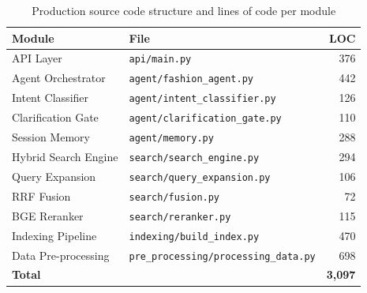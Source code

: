\begin{table}[H]
\centering
\begin{tabular}{llr}
\toprule
\textbf{Module} & \textbf{File} & \textbf{LOC}\\
\midrule
API Layer              & \texttt{api/main.py}                          & 376\\
Agent Orchestrator     & \texttt{agent/fashion\_agent.py}              & 442\\
Intent Classifier      & \texttt{agent/intent\_classifier.py}          & 126\\
Clarification Gate     & \texttt{agent/clarification\_gate.py}         & 110\\
Session Memory         & \texttt{agent/memory.py}                      & 288\\
Hybrid Search Engine   & \texttt{search/search\_engine.py}             & 294\\
Query Expansion        & \texttt{search/query\_expansion.py}           & 106\\
RRF Fusion             & \texttt{search/fusion.py}                     & 72\\
BGE Reranker           & \texttt{search/reranker.py}                   & 115\\
Indexing Pipeline      & \texttt{indexing/build\_index.py}             & 470\\
Data Pre-processing    & \texttt{pre\_processing/processing\_data.py}  & 698\\
\midrule
\textbf{Total}         &                                               & \textbf{3,097}\\
\bottomrule
\end{tabular}
\caption{Production source code structure and lines of code per module}
\end{table}

